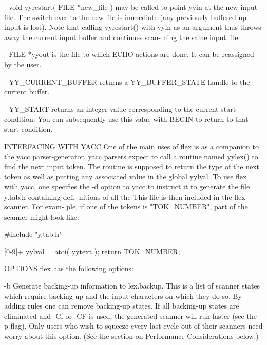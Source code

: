 \documentclass[12pt,spanish,twocolumn,lettersize]{article}
\begin{document}
{       -      void  yyrestart(	FILE *new_file ) may be called to
	      point yyin at the new input file.	 The  switch-over
	      to  the  new  file  is  immediate	 (any  previously
	      buffered-up input	 is  lost).   Note  that  calling
	      yyrestart()  with	 yyin  as an argument thus throws
	      away the current input buffer and	 continues  scan-
	      ning the same input file.

       -      FILE  *yyout  is the file to which ECHO actions are
	      done.  It can be reassigned by the user.

       -      YY_CURRENT_BUFFER returns a YY_BUFFER_STATE  handle
	      to the current buffer.

       -      YY_START	returns an integer value corresponding to
	      the current start condition.  You can  subsequently
	      use  this	 value with BEGIN to return to that start
	      condition.

INTERFACING WITH YACC
       One of the main uses of flex is as a companion to the yacc
       parser-generator.   yacc	 parsers expect to call a routine
       named yylex() to find the next input token.   The  routine
       is  supposed  to return the type of the next token as well
       as putting any associated value in the global yylval.   To
       use flex with yacc, one specifies the -d option to yacc to
       instruct it to generate the file y.tab.h containing  defi-
       nitions	of  all	 the %
       This file is then included in the flex scanner.	For exam-
       ple,  if	 one  of  the tokens is "TOK_NUMBER", part of the
       scanner might look like:

	   #include "y.tab.h"


	   [0-9]+	 yylval = atoi( yytext ); return TOK_NUMBER;

OPTIONS
       flex has the following options:

       -b     Generate	backing-up  information	 to   lex.backup.
	      This  is	a  list	 of  scanner states which require
	      backing up and the input characters on  which  they
	      do  so.	By adding rules one can remove backing-up
	      states.  If all backing-up  states  are  eliminated
	      and  -Cf or -CF is used, the generated scanner will
	      run faster (see the -p flag).  Only users who  wish
	      to  squeeze  every last cycle out of their scanners
	      need worry about this option.  (See the section  on
	      Performance Considerations below.)

}
\end{document}
